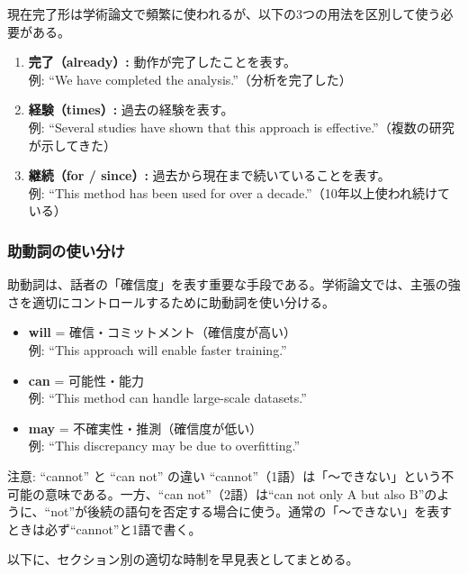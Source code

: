 現在完了形は学術論文で頻繁に使われるが、以下の3つの用法を区別して使う必要がある。

\begin{enumerate}
\item \textbf{完了（already）:} 動作が完了したことを表す。\\
例: ``We have completed the analysis.''（分析を完了した）
\item \textbf{経験（times）:} 過去の経験を表す。\\
例: ``Several studies have shown that this approach is effective.''（複数の研究が示してきた）
\item \textbf{継続（for / since）:} 過去から現在まで続いていることを表す。\\
例: ``This method has been used for over a decade.''（10年以上使われ続けている）
\end{enumerate}

\subsubsection{助動詞の使い分け}

助動詞は、話者の「確信度」を表す重要な手段である。学術論文では、主張の強さを適切にコントロールするために助動詞を使い分ける。

\begin{itemize}
\item \textbf{will} = 確信・コミットメント（確信度が高い）\\
例: ``This approach will enable faster training.''
\item \textbf{can} = 可能性・能力\\
例: ``This method can handle large-scale datasets.''
\item \textbf{may} = 不確実性・推測（確信度が低い）\\
例: ``This discrepancy may be due to overfitting.''
\end{itemize}

\begin{itembox}[l]{注意: ``cannot'' と ``can not'' の違い}
``cannot''（1語）は「〜できない」という不可能の意味である。一方、``can not''（2語）は``can not only A but also B''のように、``not''が後続の語句を否定する場合に使う。通常の「〜できない」を表すときは必ず``cannot''と1語で書く。
\end{itembox}

以下に、セクション別の適切な時制を早見表としてまとめる。

